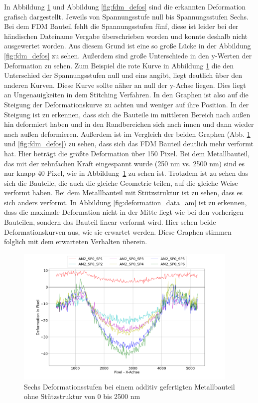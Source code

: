 In Abbildung \ref{fig:am_defos} und Abbildung \ref{fig:fdm_defos} sind die erkannten
Deformation grafisch dargestellt. Jeweils von Spannungsstufe null bis 
Spannungsstufen Sechs. Bei dem FDM Bauteil fehlt die Spannungsstufen fünf, 
diese ist leider bei der händischen Dateiname Vergabe überschrieben worden und konnte 
deshalb nicht ausgewertet worden. Aus diesem Grund ist eine so große Lücke in der 
Abbildung \ref{fig:fdm_defos} zu sehen.
Außerdem sind große Unterschiede in den y-Werten der Deformation zu sehen. Zum Beispiel 
die rote Kurve in Abbildung \ref{fig:am_defos} die den Unterschied der Spannungsstufen 
null und eins angibt, liegt deutlich über den anderen Kurven. 
Diese Kurve sollte näher an null der y-Achse liegen. 
Dies liegt an Ungenauigkeiten in dem Stitching Verfahren. In den Graphen ist also 
auf die Steigung der Deformationskurve zu achten und weniger auf ihre Position.
In der Steigung ist zu erkennen, dass
sich die Bauteile im mittleren Bereich nach außen hin deformiert haben und in 
den Randbereichen sich nach innen und dann wieder nach außen deformieren.
Außerdem ist im Vergleich der beiden Graphen (Abb. \ref{fig:am_defos} und \ref{fig:fdm_defos}) 
zu sehen, dass sich das FDM Bauteil deutlich mehr verformt hat. 
Hier beträgt die größte Deformation über 150 Pixel.
Bei dem Metallbauteil, das mit der zehnfachen Kraft eingespannt wurde (250 nm vs. 2500 nm)
sind es nur knapp 40 Pixel, wie in Abbildung~\ref{fig:am_defos} zu sehen ist.
Trotzdem ist zu sehen das sich die Bauteile, die auch die 
gleiche Geometrie teilen, auf die gleiche Weise verformt haben.
Bei dem Metallbauteil mit Stützstruktur ist zu sehen, dass es sich anders 
verformt. In Abbildung \ref{fig:deformation_data_am} ist zu erkennen, dass 
die maximale Deformation nicht in der Mitte liegt wie bei den vorherigen Bauteilen, 
sondern das Bauteil linear verformt wird. Hier sehen beide Deformationskurven aus, 
wie sie erwartet werden. Diese Graphen stimmen folglich mit dem erwarteten Verhalten überein.

\begin{figure}[H]
  \centering
  \includegraphics[width=0.95\textwidth]{images/am2_all_defos.png}
  \caption{Sechs Deformationsstufen bei einem additiv gefertigten Metallbauteil ohne
  Stützstruktur von 0 bis 2500 nm}
  \label{fig:am_defos}
\end{figure}

